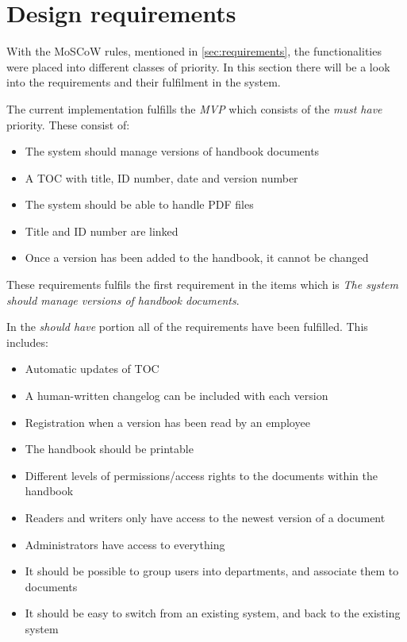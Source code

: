 \section{Design requirements}\label{sec:disdesignrequirements}
With the MoSCoW rules, mentioned in \cref{sec:requirements}, the functionalities were placed into different classes of priority.
In this section there will be a look into the requirements and their fulfilment in the system.

The current implementation fulfills the \textit{MVP} which consists of the \textit{must have} priority.
These consist of:

\begin{itemize}
	\item
	The system should manage versions of handbook documents
	\item
    A TOC with title, ID number, date and version number
    \item
    The system should be able to handle PDF files
    \item
    Title and ID number are linked
    \item
    Once a version has been added to the handbook, it cannot be changed
\end{itemize}

These requirements fulfils the first requirement in the items which is \textit{The system should manage versions of handbook documents}.

In the \textit{should have} portion all of the requirements have been fulfilled.
This includes:

\begin{itemize}
	\item
	Automatic updates of TOC
    \item
	A human-written changelog can be included with each version
	\item
    Registration when a version has been read by an employee
    \item
    The handbook should be printable
    \item
   	Different levels of permissions/access rights to the documents within the handbook
    \item
    Readers and writers only have access to the newest version of a document
    \item
    Administrators have access to everything
   	\item
    It should be possible to group users into departments, and associate them to documents
    \item
    It should be easy to switch from an existing system, and back to the existing system
\end{itemize}

